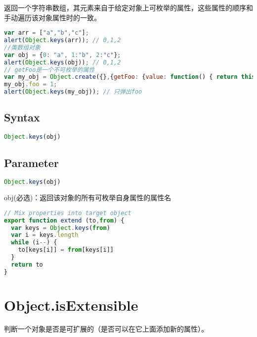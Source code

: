 返回一个字符串数组，其元素来自于给定对象上可枚举的属性，这些属性的顺序和手动遍历该对象属性时的一致。



\begin{lstlisting}[language=JavaScript]
var arr = ["a","b","c"];
alert(Object.keys(arr)); // 0,1,2
//类数组对象
var obj = {0: "a", 1:"b", 2:"c"};
alert(Object.keys(obj)); // 0,1,2
// getFoo是一个不可枚举的属性
var my_obj = Object.create({},{getFoo: {value: function() { return this.foo }}});
my_obj.foo = 1;
alert(Object.keys(my_obj)); // 只弹出foo
\end{lstlisting}

\subsection{Syntax}


\begin{lstlisting}[language=JavaScript]
Object.keys(obj)
\end{lstlisting}


\subsection{Parameter}




\begin{lstlisting}[language=JavaScript]
Object.keys(obj)
\end{lstlisting}


\begin{compactitem}
\item obj(必选)：返回该对象的所有可枚举自身属性的属性名
\end{compactitem}







\begin{lstlisting}[language=JavaScript]
// Mix properties into target object
export function extend (to,from) {
  var keys = Object.keys(from)
  var i = keys.length
  while (i--) {
    to[keys[i]] = from[keys[i]]
  }
  return to
}
\end{lstlisting}

\section{Object.isExtensible}

判断一个对象是否是可扩展的（是否可以在它上面添加新的属性）。


